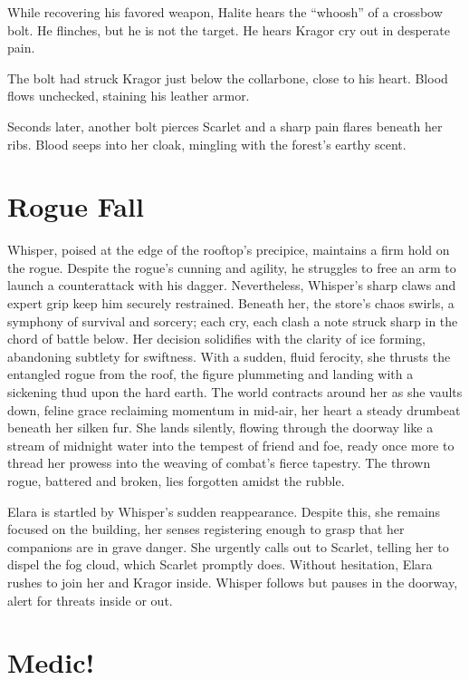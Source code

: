 \documentclass[
  12pt,twoside,twocolumn,openany,nodeprecatedcode]{dndbook}
\begin{document}
While recovering his favored weapon, Halite hears the ``whoosh'' of a
crossbow bolt. He flinches, but he is not the target. He hears Kragor
cry out in desperate pain.

The bolt had struck Kragor just below the collarbone, close to his
heart. Blood flows unchecked, staining his leather armor.

Seconds later, another bolt pierces Scarlet and a sharp pain flares
beneath her ribs. Blood seeps into her cloak, mingling with the forest's
earthy scent.

\section{Rogue Fall}\label{rogue-fall}

Whisper, poised at the edge of the rooftop's precipice, maintains a firm
hold on the rogue. Despite the rogue's cunning and agility, he struggles
to free an arm to launch a counterattack with his dagger. Nevertheless,
Whisper's sharp claws and expert grip keep him securely restrained.
Beneath her, the store's chaos swirls, a symphony of survival and
sorcery; each cry, each clash a note struck sharp in the chord of battle
below. Her decision solidifies with the clarity of ice forming,
abandoning subtlety for swiftness. With a sudden, fluid ferocity, she
thrusts the entangled rogue from the roof, the figure plummeting and
landing with a sickening thud upon the hard earth. The world contracts
around her as she vaults down, feline grace reclaiming momentum in
mid-air, her heart a steady drumbeat beneath her silken fur. She lands
silently, flowing through the doorway like a stream of midnight water
into the tempest of friend and foe, ready once more to thread her
prowess into the weaving of combat's fierce tapestry. The thrown rogue,
battered and broken, lies forgotten amidst the rubble.

Elara is startled by Whisper's sudden reappearance. Despite this, she
remains focused on the building, her senses registering enough to grasp
that her companions are in grave danger. She urgently calls out to
Scarlet, telling her to dispel the fog cloud, which Scarlet promptly
does. Without hesitation, Elara rushes to join her and Kragor inside.
Whisper follows but pauses in the doorway, alert for threats inside or
out.

\section{Medic!}\label{medic}
\end{document}
